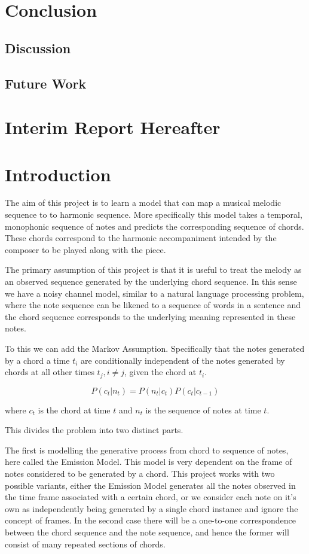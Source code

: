 \documentclass[bsc,singlespacing,logo, parskip, deptreport]{infthesis}
\begin{document}
\chapter{Conclusion}

\section{Discussion}

\section{Future Work}


\chapter{Interim Report Hereafter}
\chapter{Introduction}
The aim of this project is to learn a model that can map a musical melodic sequence to to harmonic sequence. More specifically this model takes a temporal, monophonic sequence of notes and predicts the corresponding sequence of chords. These chords correspond to the harmonic accompaniment intended by the composer to be played along with the piece.

The primary assumption of this project is that it is useful to treat the melody as an observed sequence generated by the underlying chord sequence. In this sense we have a noisy channel model, similar to a natural language processing problem, where the note sequence can be likened to a sequence of words in a sentence and the chord sequence corresponds to the underlying meaning represented in these notes.

To this we can add the Markov Assumption. Specifically that the notes generated by a chord a time $t_i$ are conditionally independent of the notes generated by chords at all other times $t_j, i \neq j$, given the chord at $t_i$.

\begin{equation} \label{eq1}
P(c_t | n_t) = P(n_t | c_t) P(c_t | c_{t-1})
\end{equation}

where $c_t$ is the chord at time $t$ and $n_t$ is the sequence of notes at time $t$.

This divides the problem into two distinct parts.

The first is modelling the generative process from chord to sequence of notes, here called the Emission Model. This model is very dependent on the frame of notes considered to be generated by a chord. This project works with two possible variants, either the Emission Model generates all the notes observed in the time frame associated with a certain chord, or we consider each note on it's own as independently being generated by a single chord instance and ignore the concept of frames. In the second case there will be a one-to-one correspondence between the chord sequence and the note sequence, and hence the former will consist of many repeated sections of chords.
\end{document}
